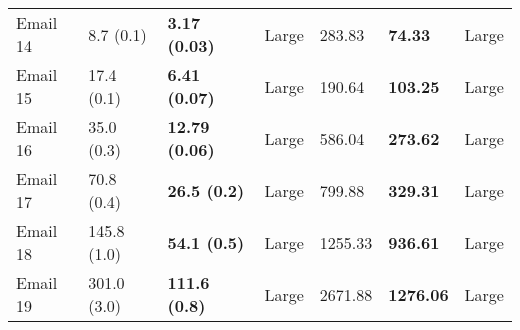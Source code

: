 \begin{tabular}{lllllll}
 Email 14 &         8.7 (0.1) &   \textbf{3.17 (0.03)} &       Large &                  283.83 &           \textbf{74.33} &       Large \\
 Email 15 &        17.4 (0.1) &   \textbf{6.41 (0.07)} &       Large &                  190.64 &          \textbf{103.25} &       Large \\
 Email 16 &        35.0 (0.3) &  \textbf{12.79 (0.06)} &       Large &                  586.04 &          \textbf{273.62} &       Large \\
 Email 17 &        70.8 (0.4) &    \textbf{26.5 (0.2)} &       Large &                  799.88 &          \textbf{329.31} &       Large \\
 Email 18 &       145.8 (1.0) &    \textbf{54.1 (0.5)} &       Large &                 1255.33 &          \textbf{936.61} &       Large \\
 Email 19 &       301.0 (3.0) &   \textbf{111.6 (0.8)} &       Large &                 2671.88 &         \textbf{1276.06} &       Large \\
\bottomrule
\end{tabular}
